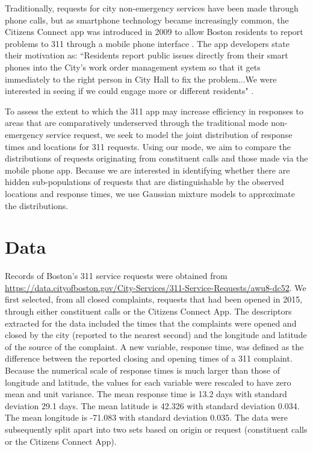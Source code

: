 \documentclass[twoside]{article}
\theoremstyle{theorem}
\theoremstyle{theorem}
\theoremstyle{theorem}
\theoremstyle{lemma}
\theoremstyle{definition}
\theoremstyle{example}
\begin{document}
Traditionally, requests for city non-emergency services have been made through phone calls, but as smartphone technology became increasingly common, the Citizens Connect app was introduced in 2009 to allow Boston residents to report problems to 311 through a mobile phone interface \cite{newurbanmechanics}. The app developers state their motivation as: ``Residents report public issues directly from their smart phones into the City's work order management system so that it gets immediately to the right person in City Hall to fix the problem...We were interested in seeing if we could engage more or different residents" \cite{newurbanmechanics}.  

To assess the extent to which the 311 app may increase efficiency in responses to areas that are comparatively underserved through the traditional mode non-emergency service request, we seek to model the joint distribution of response times and locations for 311 requests. Using our mode, we aim to compare the distributions of requests originating from constituent calls and those made via the mobile phone app. Because we are interested in identifying whether there are hidden sub-populations of requests that are distinguishable by the observed locations and response times, we use Gaussian mixture models to approximate the distributions. 
\section{Data}
Records of Boston's 311 service requests were obtained from \url{https://data.cityofboston.gov/City-Services/311-Service-Requests/awu8-dc52}. We first selected, from all closed complaints, requests that had been opened in 2015, through either constituent calls or the Citizens Connect App. The descriptors extracted for the data included the times that the complaints were opened and closed by the city (reported to the nearest second) and the longitude and latitude of the source of the complaint. A new variable, response time, was defined as the difference between the reported closing and opening times of a 311 complaint. Because the numerical scale of response times is much larger than those of longitude and latitude, the values for each variable were rescaled to have zero mean and unit variance. The mean response time is 13.2 days with standard deviation 29.1 days. The mean latitude is 42.326 with standard deviation 0.034. The mean longitude is -71.083 with standard deviation 0.035. The data were subsequently split apart into two sets based on origin or request (constituent calls or the Citizens Connect App). 
\end{document}
